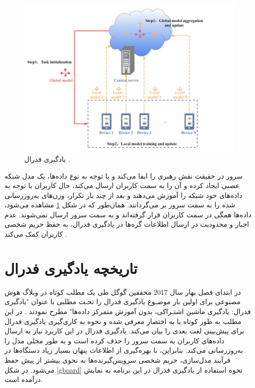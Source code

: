  \begin{figure}[t]
	\centering
	\includegraphics[scale=0.7]{images/chap1/federated_learning.png}%
	\caption{%
		یادگیری فدرال 
		\cite{ma2022state}%
		.
	}
	\label{federated_learning}
	\centering
\end{figure}

سرور در حقیقت نقش رهبری را ایفا می‌کند و با توجه به نوع داده‌ها، یک مدل شبکه عصبی%
ایجاد کرده و آن را به سمت کاربران ارسال می‌کند، حال کاربران با توجه به داده‌های خود شبکه را آموزش می‌دهند و بعد از چند بار تکرار، وزن‌های به‌روزرسانی شده را به سمت سرور بر می‌گردانند. همان‌طور که در شکل
\ref{federated_learning}
مشاهده می‌شود، داده‌ها همگی در سمت کاربران قرار گرفته‌اند و به سمت سرور ارسال نمی‌شوند. عدم اجبار و محدودیت در ارسال اطلاعات گره‌ها در یادگیری فدرال، به حفظ حریم شخصی کاربران کمک می‌کند
\cite{smith2017federated}%
.


\section{تاریخچه یادگیری فدرال}
در ابتدای فصل بهار سال 2017 محققین گوگل
طی یک مطلب کوتاه در وبلاگ هوش مصنوعی برای اولین بار موضـوع یادگیری فدرال را تحـت مطلبی با عنوان "یادگیری فدرال: یادگیری ماشین اشتـراکی، بدون آموزش متمرکز داده‌ها" مطرح نمودند
\cite{mcmahan2017federated}%
. در این مطلب به طور کوتاه
یا به اختصار
معرفی شده و نحوه به کاری‌گیری یادگیری فدرال برای پیش‌بینی لغت بعدی را بیان می‌کند. یادگیری فدرال در این کاربرد نیاز به ارسال داده‌های کاربران به سمت سرور را حذف کرده است و به طور محلی مدل را به‌روزرسانی می‌کند.
بنابراین، با بهره‌گیری از اطلاعات پنهان بسیار زیاد دستگاه‌ها در فرآیند مدل‌سازی، حریم شخصی سرویس‌گیرنده‌ها به نحوی بیشتر از پیش حفظ می‌شود.
در شکل
\ref{gboard}
نحوه استفاده از یادگیری فدرال در این برنامه به نمایش درآمده است.

